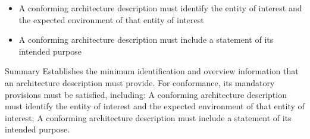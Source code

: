 \documentclass[10pt,letterpaper]{article}
\begin{document}
\begin{CornellNotesTable}
{\begin{itemize}[leftmargin=*,nosep,topsep=1pt]
\item A conforming architecture description must identify the entity of interest and the expected environment of that entity of interest
\item A conforming architecture description must include a statement of its intended purpose
\end{itemize}}
\end{CornellNotesTable}


\begin{CornellSummaryBox}{Summary}
Establishes the minimum identification and overview information that an architecture description must provide. For conformance, its mandatory provisions must be satisfied, including: A conforming architecture description must identify the entity of interest and the expected environment of that entity of interest; A conforming architecture description must include a statement of its intended purpose.
\end{CornellSummaryBox}
\end{document}
